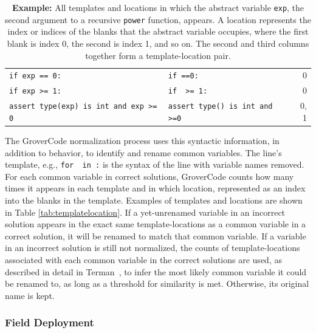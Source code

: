 \begin{table}
\begin{tabular}{l l r}
\footnotesize{\texttt{if exp == 0:}} & \footnotesize{\texttt{if \underline{\hspace{1em}}==0:}} & 0 \\
\footnotesize{\texttt{if exp >= 1:}} & \footnotesize{\texttt{if \underline{\hspace{1em}} >= 1:}} & 0 \\
\footnotesize{\texttt{assert type(exp) is int and exp >= 0}} & \footnotesize{\texttt{assert type(\underline{\hspace{1em}}) is int and \underline{\hspace{1em}}>=0}} & 0, 1 \\
\end{tabular}
\caption{\textbf{Example:} All templates and locations in which the abstract variable \texttt{exp}, the second argument to a recursive \texttt{power} function, appears. A location represents the index or indices of the blanks that the abstract variable occupies, where the first blank is index 0, the second is index 1, and so on. The second and third columns together form a template-location pair.} 
\label{tab:templatelocation}
\end{table}

The GroverCode normalization process uses this syntactic information, in addition to behavior, to identify and rename common variables. The line's template, e.g., \texttt{for \underline{\hspace{1em}} in \underline{\hspace{1em}}:} is the syntax of the line with variable names removed. For each common variable in correct solutions, GroverCode counts how many times it appears in each template and in which location, represented as an index into the blanks in the template. Examples of templates and locations are shown in Table \autoref{tab:templatelocation}. If a yet-unrenamed variable in an incorrect solution appears in the exact same template-locations as a common variable in a correct solution, it will be renamed to match that common variable. If a variable in an incorrect solution is still not normalized, the counts of template-locations associated with each common variable in the correct solutions are used, as described in detail in Terman~\cite{staceythesis}, to infer the most likely common variable it could be renamed to, as long as a threshold for similarity is met. Otherwise, its original name is kept.





\subsubsection{Field Deployment}

